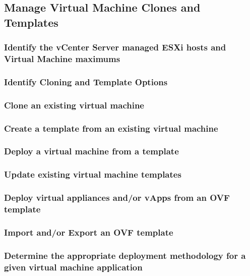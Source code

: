 \subsection{Manage Virtual Machine Clones and Templates}

\subsubsection{Identify the vCenter Server managed ESXi hosts and Virtual Machine maximums}

\subsubsection{Identify Cloning and Template Options}

\subsubsection{Clone an existing virtual machine}

\subsubsection{Create a template from an existing virtual machine}

\subsubsection{Deploy a virtual machine from a template}

\subsubsection{Update existing virtual machine templates}

\subsubsection{Deploy virtual appliances and/or vApps from an OVF template}

\subsubsection{Import and/or Export an OVF template}

\subsubsection{Determine the appropriate deployment methodology for a given virtual machine application}
